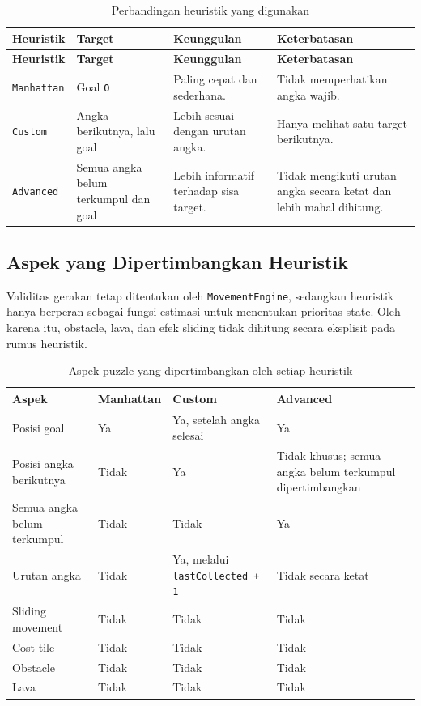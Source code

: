 \begin{longtable}{|p{3cm}|p{3.8cm}|p{3.3cm}|p{3.8cm}|}
	\caption{Perbandingan heuristik yang digunakan} \\
	\hline
	\rowcolor{orange!20}
	\textbf{Heuristik} & \textbf{Target} & \textbf{Keunggulan} & \textbf{Keterbatasan} \\
	\hline
	\endfirsthead
	
	\hline
	\rowcolor{orange!20}
	\textbf{Heuristik} & \textbf{Target} & \textbf{Keunggulan} & \textbf{Keterbatasan} \\
	\hline
	\endhead
	
	\texttt{Manhattan} & Goal \texttt{O} & Paling cepat dan sederhana. & Tidak memperhatikan angka wajib. \\
	\hline
	\texttt{Custom} & Angka berikutnya, lalu goal & Lebih sesuai dengan urutan angka. & Hanya melihat satu target berikutnya. \\
	\hline
	\texttt{Advanced} & Semua angka belum terkumpul dan goal & Lebih informatif terhadap sisa target. & Tidak mengikuti urutan angka secara ketat dan lebih mahal dihitung. \\
	\hline
\end{longtable}

\subsection{Aspek yang Dipertimbangkan Heuristik}

Validitas gerakan tetap ditentukan oleh \texttt{MovementEngine}, sedangkan heuristik hanya berperan sebagai fungsi estimasi untuk menentukan prioritas state. 
Oleh karena itu, obstacle, lava, dan efek sliding tidak dihitung secara eksplisit pada rumus heuristik.

\begin{table}[H]
	\centering
	\caption{Aspek puzzle yang dipertimbangkan oleh setiap heuristik}
	\small
	\begin{tabular}{|p{3.8cm}|p{2.8cm}|p{2.8cm}|p{2.8cm}|}
		\hline
		\rowcolor{orange!20}
		\textbf{Aspek} & \textbf{Manhattan} & \textbf{Custom} & \textbf{Advanced} \\
		\hline
		Posisi goal & Ya & Ya, setelah angka selesai & Ya \\
		\hline
		Posisi angka berikutnya & Tidak & Ya & Tidak khusus; semua angka belum terkumpul dipertimbangkan \\
		\hline
		Semua angka belum terkumpul & Tidak & Tidak & Ya \\
		\hline
		Urutan angka & Tidak & Ya, melalui \texttt{lastCollected + 1} & Tidak secara ketat \\
		\hline
		Sliding movement & Tidak & Tidak & Tidak \\
		\hline
		Cost tile & Tidak & Tidak & Tidak \\
		\hline
		Obstacle & Tidak & Tidak & Tidak \\
		\hline
		Lava & Tidak & Tidak & Tidak \\
		\hline
	\end{tabular}
\end{table}

